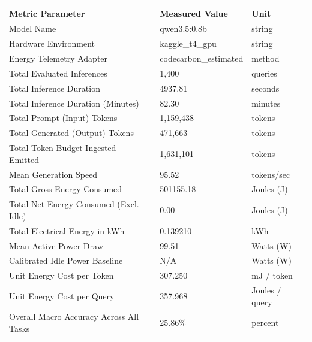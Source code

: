 \begin{tabular}{lll}
\toprule
Metric Parameter & Measured Value & Unit \\
\midrule
Model Name & qwen3.5:0.8b & string \\
Hardware Environment & kaggle\_t4\_gpu & string \\
Energy Telemetry Adapter & codecarbon\_estimated & method \\
Total Evaluated Inferences & 1,400 & queries \\
Total Inference Duration & 4937.81 & seconds \\
Total Inference Duration (Minutes) & 82.30 & minutes \\
Total Prompt (Input) Tokens & 1,159,438 & tokens \\
Total Generated (Output) Tokens & 471,663 & tokens \\
Total Token Budget Ingested + Emitted & 1,631,101 & tokens \\
Mean Generation Speed & 95.52 & tokens/sec \\
Total Gross Energy Consumed & 501155.18 & Joules (J) \\
Total Net Energy Consumed (Excl. Idle) & 0.00 & Joules (J) \\
Total Electrical Energy in kWh & 0.139210 & kWh \\
Mean Active Power Draw & 99.51 & Watts (W) \\
Calibrated Idle Power Baseline & N/A & Watts (W) \\
Unit Energy Cost per Token & 307.250 & mJ / token \\
Unit Energy Cost per Query & 357.968 & Joules / query \\
Overall Macro Accuracy Across All Tasks & 25.86\% & percent \\
\bottomrule
\end{tabular}

